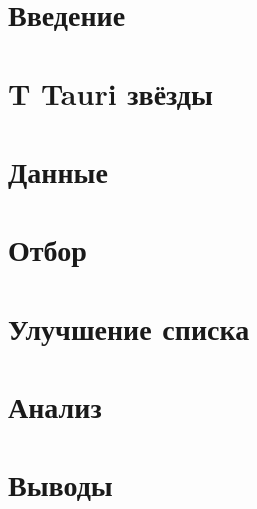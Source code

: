 \documentclass[a4paper,12pt]{report}
\begin{document}


\tableofcontents

\chapter{Введение}


\chapter{T Tauri звёзды}


\chapter{Данные}


\chapter{Отбор}


\chapter{Улучшение списка}


\chapter{Анализ}


\chapter{Выводы}



\end{document}
